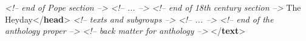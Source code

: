 \begin{shaded}
\textit{<!-- end of Pope section -->}\mbox{}\newline 
\textit{<!-- ... -->}\mbox{}\newline 
\hspace*{1em}\mbox{}\newline 
\textit{<!-- end of 18th century section -->}\mbox{}\newline 
\hspace*{1em}\mbox{}\newline 
\hspace*{1em}\hspace*{1em}The Heyday{</\textbf{head}>}\mbox{}\newline 
\textit{<!-- texts and subgroups -->}\mbox{}\newline 
\hspace*{1em}\mbox{}\newline 
\textit{<!-- ... -->}\mbox{}\newline 
{}\mbox{}\newline 
\textit{<!-- end of the anthology proper -->}\mbox{}\newline 
{}\mbox{}\newline 
\textit{<!-- back matter for anthology -->}\mbox{}\newline 
{}\mbox{}\newline 
{</\textbf{text}>}\end{shaded}\egroup\par \par
